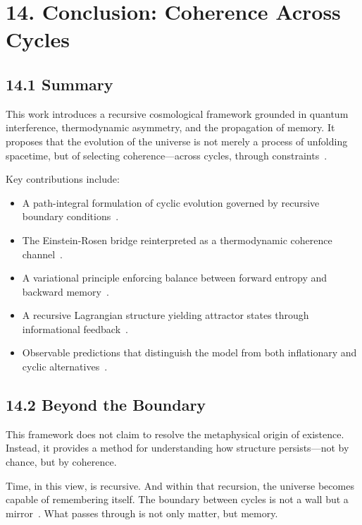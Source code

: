 \section*{14. Conclusion: Coherence Across Cycles}

\subsection*{14.1 Summary}

This work introduces a recursive cosmological framework grounded in quantum interference, thermodynamic asymmetry, and the propagation of memory. It proposes that the evolution of the universe is not merely a process of unfolding spacetime, but of selecting coherence---across cycles, through constraints~\cite{zurek2009quantum, breuer2002theory, ashtekar2006quantum}.

Key contributions include:
\begin{itemize}
    \item A path-integral formulation of cyclic evolution governed by recursive boundary conditions~\cite{hartle1983wave}.
    \item The Einstein-Rosen bridge reinterpreted as a thermodynamic coherence channel~\cite{maldacena2013cool}.
    \item A variational principle enforcing balance between forward entropy and backward memory~\cite{gellmann1994complex}.
    \item A recursive Lagrangian structure yielding attractor states through informational feedback~\cite{ashtekar2011loop}.
    \item Observable predictions that distinguish the model from both inflationary and cyclic alternatives~\cite{planck2019inflation, penrose2010cycles, guth1981inflationary}.
\end{itemize}

\subsection*{14.2 Beyond the Boundary}

This framework does not claim to resolve the metaphysical origin of existence. Instead, it provides a method for understanding how structure persists---not by chance, but by coherence.

Time, in this view, is recursive. And within that recursion, the universe becomes capable of remembering itself. The boundary between cycles is not a wall but a mirror~\cite{verlinde2021emergent}. What passes through is not only matter, but memory.

